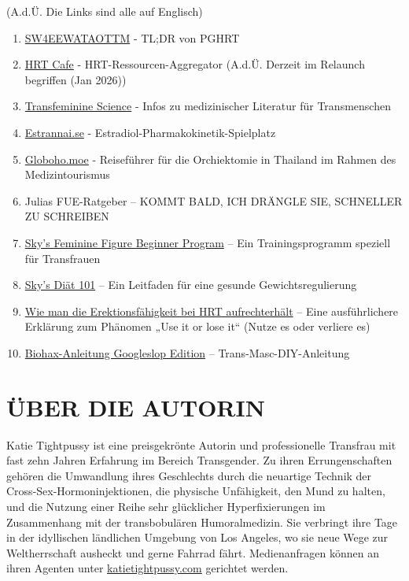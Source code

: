\documentclass{article}
\begin{document}
{{{(A.d.Ü. Die Links sind alle auf Englisch)

\begin{enumerate}
  \item \href{https://startwith4mgestradiolenanthateweeklyandtestatonetothreemonths.com/}{SW4EEWATAOTTM} - TL;DR von PGHRT
  \item \href{https://hrtcafe.net/}{HRT Cafe} - HRT-Ressourcen-Aggregator (A.d.Ü. Derzeit im Relaunch begriffen (Jan 2026))
  \item \href{https://transfemscience.org/}{Transfeminine Science} - Infos zu medizinischer Literatur für Transmenschen
  \item \href{http://estrannai.se}{Estrannai.se} - Estradiol-Pharmakokinetik-Spielplatz
  \item \href{https://globoho.moe/}{Globoho.moe} - Reiseführer für die Orchiektomie in Thailand im Rahmen des Medizintourismus
  \item Julias FUE-Ratgeber – KOMMT BALD, ICH DRÄNGLE SIE, SCHNELLER ZU SCHREIBEN
  \item \href{https://docs.google.com/document/d/1-NyE5EY5TTaRRMhk7HlTbKJ7HifjEsA4jlDO1qKQVl0/edit?tab=t.0}{Sky's Feminine Figure Beginner Program} – Ein Trainingsprogramm speziell für Transfrauen
  \item \href{https://docs.google.com/document/d/114sztSw1aVWM2pXLDl9NrHklyvewz3EmFiHiisjM71k/edit?tab=t.0}{Sky's Diät 101} – Ein Leitfaden für eine gesunde Gewichtsregulierung
  \item \href{https://stainedglasswoman.substack.com/p/how-to-maintain-your-penis-function}{Wie man die Erektionsfähigkeit bei HRT aufrechterhält} – Eine ausführlichere Erklärung zum Phänomen „Use it or lose it“ (Nutze es oder verliere es)
  \item \href{hhttps://docs.google.com/document/d/1DXFxzN0XTudPZez_SO61fpqncRLPH_Be_QG_8Pcz9LU/edit?pli=1&tab=t.0}{Biohax-Anleitung Googleslop Edition} – Trans-Masc-DIY-Anleitung
\end{enumerate}

\section*{ÜBER DIE AUTORIN}

Katie Tightpussy ist eine preisgekrönte Autorin und professionelle Transfrau mit fast zehn Jahren Erfahrung im Bereich Transgender. Zu ihren Errungenschaften gehören die Umwandlung ihres Geschlechts durch die neuartige Technik der Cross-Sex-Hormoninjektionen, die physische Unfähigkeit, den Mund zu halten, und die Nutzung einer Reihe sehr glücklicher Hyperfixierungen im Zusammenhang mit der transbobulären Humoralmedizin. Sie verbringt ihre Tage in der idyllischen ländlichen Umgebung von Los Angeles, wo sie neue Wege zur Weltherrschaft ausheckt und gerne Fahrrad fährt. Medienanfragen können an ihren Agenten unter \href{http://katietightpussy.com}{katietightpussy.com} gerichtet werden.

}}}
\end{document}
